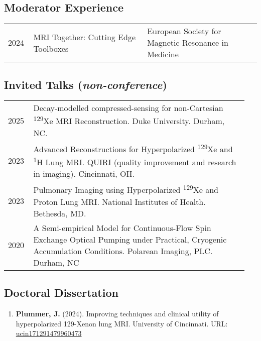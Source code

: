 \documentclass[12pt,]{scrartcl}
\begin{document}
\newpage

\subsection{Moderator Experience}\label{moderator}

\begin{table}[!h]
{\def\arraystretch{1.5}\tabcolsep=0pt
\begin{tabular}{p{0.10\linewidth}p{0.45\linewidth}p{0.45\linewidth}}

2024 & MRI Together: Cutting Edge Toolboxes & European Society for Magnetic Resonance in Medicine \\

\end{tabular}%
}
\end{table}


\subsection{Invited Talks (\textit{non-conference})}\label{presentations-and-talks}

\begin{table}[!h]
{\def\arraystretch{1.5}\tabcolsep=0pt
\begin{tabular}{p{0.10\linewidth}p{0.85\linewidth}}

    2025 & Decay-modelled compressed-sensing for non-Cartesian \textsuperscript{129}Xe MRI Reconstruction. Duke University. Durham, NC. \\
  
  2023 & Advanced Reconstructions for Hyperpolarized \textsuperscript{129}Xe and \textsuperscript{1}H Lung MRI. QUIRI (quality improvement and research in imaging). Cincinnati, OH. \\

  2023 & Pulmonary Imaging using Hyperpolarized \textsuperscript{129}Xe and Proton Lung MRI. National Institutes of Health. Bethesda, MD. \\

  2020 & A Semi-empirical Model for Continuous-Flow Spin Exchange Optical Pumping under Practical, Cryogenic Accumulation Conditions. Polarean Imaging, PLC. Durham, NC \\

    
  
\end{tabular}%
}
\end{table}

\subsection{Doctoral Dissertation}\label{dissertation}
\begin{enumerate}
    \leftskip-0.13in
    \item \textbf{Plummer, J.} (2024). Improving techniques and clinical utility of hyperpolarized 129-Xenon lung MRI. University of Cincinnati. URL: \href{http://rave.ohiolink.edu/etdc/view?acc_num=ucin171291479960473}{ucin171291479960473}
    
\end{enumerate}
\end{document}
